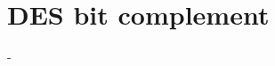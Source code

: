 \section{DES bit complement}
-

\begin{comment}
DES has an incredible property concerning the bitwise complement of the input and output bits. The
complement (meaning all Bits are inverted) of a bit stream A is given with A0(example: If A = 0110
the complement is A0 = 1001.) “bXOR“ is the bitwise XOR. We want to show that: If
y = DES_k(x)
than also is:
y_0 = DES_k0 (x0):
Meaning if we sent the complement of the message and the key than the complement of the original
cipher text is returned. Your exercise is to proof this property. (Hint: Try to proof the property for any
round instead of calculating all 16 rounds!)
\end{comment}
